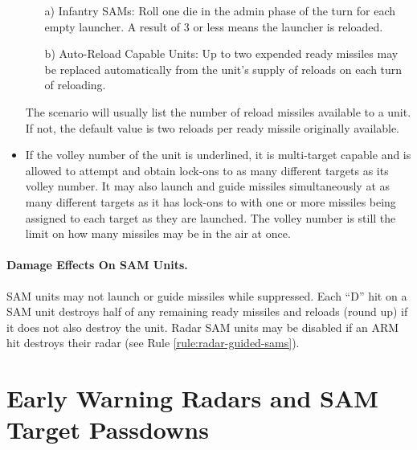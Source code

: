 \begin{itemize}
    \begin{enumerate}
        \item[a)] Infantry SAMs: Roll one die in the admin phase of the turn for each empty launcher. A result of 3 or less means the launcher is reloaded.

        \item[b)] Auto-Reload Capable Units: Up to two expended ready missiles may be replaced automatically from the unit's supply of reloads on each turn of reloading.
    \end{enumerate}

    The scenario will usually list the number of reload missiles available to a unit. If not, the default value is two reloads per ready missile originally available.

    \item{} If the volley number of the unit is underlined, it is multi-target capable and is allowed to attempt and obtain lock-ons to as many different targets as its volley number. It may also launch and guide missiles simultaneously at as many different targets as it has lock-ons to with one or more missiles being assigned to each target as they are launched. The volley number is still the limit on how many missiles may be in the air at once.   

\end{itemize}

\paragraph{Damage Effects On SAM Units.} SAM units may not launch or guide missiles while suppressed. Each “D” hit on a SAM unit destroys half of any remaining ready missiles and reloads (round up) if it does not also destroy the unit. Radar SAM units may be disabled if an ARM hit destroys their radar (see Rule \ref{rule:radar-guided-sams}).


\section{Early Warning Radars and SAM Target Passdowns}

